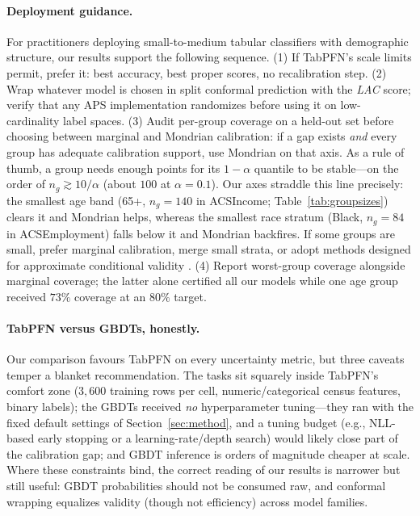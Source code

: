 \documentclass[review,12pt]{elsarticle}
\begin{document}
\paragraph{Deployment guidance.}
For practitioners deploying small-to-medium tabular classifiers with demographic structure, our results support the following sequence. (1) If TabPFN's scale limits permit, prefer it: best accuracy, best proper scores, no recalibration step. (2) Wrap whatever model is chosen in split conformal prediction with the \emph{LAC} score; verify that any APS implementation randomizes before using it on low-cardinality label spaces. (3) Audit per-group coverage on a held-out set before choosing between marginal and Mondrian calibration: if a gap exists \emph{and} every group has adequate calibration support, use Mondrian on that axis. As a rule of thumb, a group needs enough points for its $1-\alpha$ quantile to be stable---on the order of $n_g \gtrsim 10/\alpha$ (about $100$ at $\alpha=0.1$). Our axes straddle this line precisely: the smallest age band (65+, $n_g=140$ in ACSIncome; Table~\ref{tab:groupsizes}) clears it and Mondrian helps, whereas the smallest race stratum (Black, $n_g=84$ in ACSEmployment) falls below it and Mondrian backfires. If some groups are small, prefer marginal calibration, merge small strata, or adopt methods designed for approximate conditional validity \cite{gibbs2023,jung2023}. (4) Report worst-group coverage alongside marginal coverage; the latter alone certified all our models while one age group received $73\%$ coverage at an $80\%$ target.

\paragraph{TabPFN versus GBDTs, honestly.}
Our comparison favours TabPFN on every uncertainty metric, but three caveats temper a blanket recommendation. The tasks sit squarely inside TabPFN's comfort zone ($3{,}600$ training rows per cell, numeric/categorical census features, binary labels); the GBDTs received \emph{no} hyperparameter tuning---they ran with the fixed default settings of Section~\ref{sec:method}, and a tuning budget (e.g., NLL-based early stopping or a learning-rate/depth search) would likely close part of the calibration gap; and GBDT inference is orders of magnitude cheaper at scale. Where these constraints bind, the correct reading of our results is narrower but still useful: GBDT probabilities should not be consumed raw, and conformal wrapping equalizes validity (though not efficiency) across model families.
\end{document}
